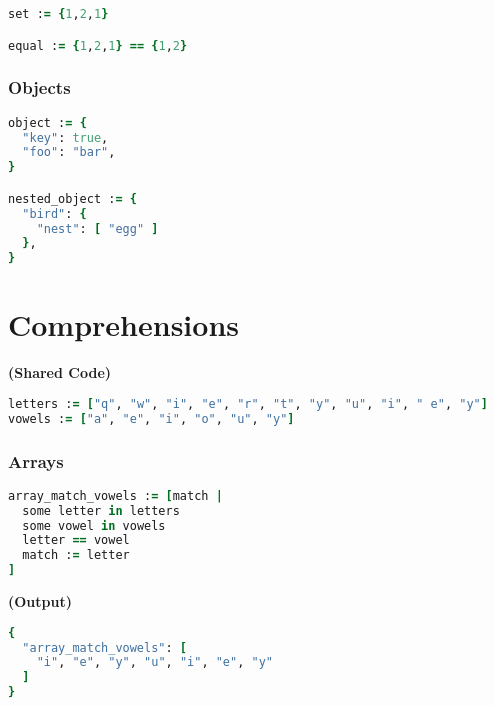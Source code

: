 \documentclass[twocolumn]{article}
\begin{document}
\begin{lstlisting}[language=Ruby]
set := {1,2,1}

equal := {1,2,1} == {1,2}
\end{lstlisting}





\vspace{-1em}
\subsubsection*{Objects}

\begin{lstlisting}[language=Ruby]
object := {
  "key": true,
  "foo": "bar",
}

nested_object := {
  "bird": {
    "nest": [ "egg" ]
  },
}
\end{lstlisting}






\section*{Comprehensions}


\textbf{\tiny{(Shared Code)}}
\begin{lstlisting}[language=Ruby]
letters := ["q", "w", "i", "e", "r", "t", "y", "u", "i", " e", "y"]
vowels := ["a", "e", "i", "o", "u", "y"]
\end{lstlisting}



\vspace{-1em}
\subsubsection*{Arrays}

\begin{lstlisting}[language=Ruby]
array_match_vowels := [match |
  some letter in letters
  some vowel in vowels
  letter == vowel
  match := letter
]
\end{lstlisting}



\textbf{\tiny{(Output)}}
\begin{lstlisting}[language=Ruby]
{
  "array_match_vowels": [
    "i", "e", "y", "u", "i", "e", "y"
  ]
}

\end{lstlisting}



\vspace{-1em}
\end{document}
